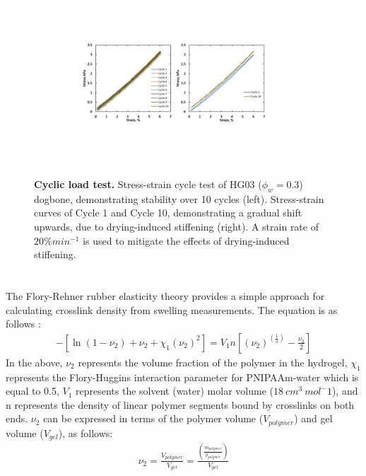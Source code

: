 \begin{figure}[!th]
      \centering
      \includegraphics[width=\textwidth]{stressCycle.pdf}
      \caption[]{\textbf{Cyclic load test.} Stress-strain cycle test of HG03 ($\phi_{w}=0.3$) dogbone, demonstrating stability over 10 cycles (left). Stress-strain curves of Cycle 1 and Cycle 10, demonstrating a gradual shift upwards, due to drying-induced stiffening (right). A strain rate of $20\% min^{-1}$ is used to mitigate the effects of drying-induced stiffening.}
      \label{fig:stressCycle}
\end{figure}

\section{}
The Flory-Rehner rubber elasticity theory provides a simple approach for calculating crosslink density from swelling measurements. The equation is as follows :
\begin{align}
	-[\ln⁡(1-\nu_2)+\nu_2+\chi_1 (\nu_2 )^2 ]=V_1 n[(\nu_2 )^{(\frac{1}{3})}-\frac{\nu_2}{2}]
\end{align}
In the above, $\nu_{2}$ represents the volume fraction of the polymer in the hydrogel, $\chi_{1}$  represents the Flory-Huggins interaction parameter for PNIPAAm-water  which is equal to 0.5,  $V_{1}$ represents the solvent (water) molar volume ($18~cm^3~mol^-1$), and n represents the density of linear polymer segments bound by crosslinks on both ends. $\nu_{2}$ can be expressed in terms of the polymer volume ($V_{polymer}$) and gel volume ($V_{gel}$), as follows:
\begin{align}
	\nu_2=\frac{V_{polymer}}{V_{gel}} =\frac{(\frac{{m_{polymer}}}{\rho_{polymer}})}{V_{gel}} 
\end{align}

